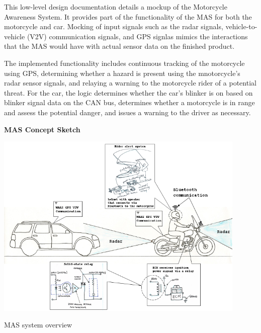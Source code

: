 This low-\/level design documentation details a mockup of the Motorcycle Awareness System. It provides part of the functionality of the M\-A\-S for both the motorcycle and car. Mocking of input signals such as the radar signals, vehicle-\/to-\/vehicle (V2\-V) communication signals, and G\-P\-S signlas mimics the interactions that the M\-A\-S would have with actual sensor data on the finished product.

The implemented functionality includes continuous tracking of the motorcycle using G\-P\-S, determining whether a hazard is present using the mnotorcycle's radar sensor signals, and relaying a warning to the motorcycle rider of a potential threat. For the car, the logic determines whether the car's blinker is on based on blinker signal data on the C\-A\-N bus, determines whether a motorcycle is in range and assess the potential danger, and issues a warning to the driver as necessary.

{\bfseries M\-A\-S Concept Sketch}  
\begin{DoxyImage}
\includegraphics[width=12cm]{MAS_system_overview}
\caption{M\-A\-S system overview}
\end{DoxyImage}
 